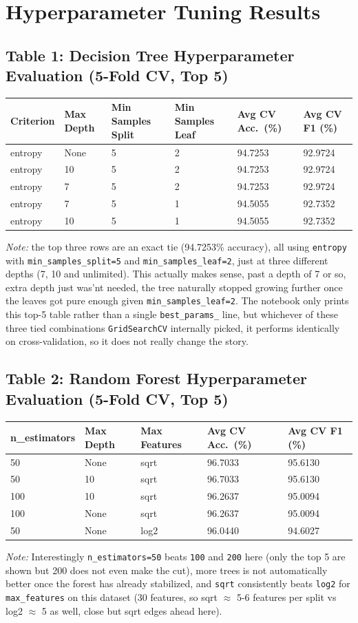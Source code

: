 \documentclass[12pt,a4paper]{article}
\begin{document}
\section{Hyperparameter Tuning Results}

\subsection*{Table 1: Decision Tree Hyperparameter Evaluation (5-Fold CV, Top 5)}
\begin{longtable}{p{1.6cm}p{1.6cm}p{2.4cm}p{2.4cm}p{2.2cm}p{2.2cm}}
\toprule
Criterion & Max Depth & Min Samples Split & Min Samples Leaf & Avg CV Acc.\ (\%) & Avg CV F1 (\%) \\
\midrule
entropy & None & 5 & 2 & 94.7253 & 92.9724 \\
entropy & 10 & 5 & 2 & 94.7253 & 92.9724 \\
entropy & 7 & 5 & 2 & 94.7253 & 92.9724 \\
entropy & 7 & 5 & 1 & 94.5055 & 92.7352 \\
entropy & 10 & 5 & 1 & 94.5055 & 92.7352 \\
\bottomrule
\end{longtable}
\textit{Note:} the top three rows are an exact tie (94.7253\% accuracy), all using \texttt{entropy} with \texttt{min\_samples\_split=5} and \texttt{min\_samples\_leaf=2}, just at three different depths (7, 10 and unlimited). This actually makes sense, past a depth of 7 or so, extra depth just was'nt needed, the tree naturally stopped growing further once the leaves got pure enough given \texttt{min\_samples\_leaf=2}. The notebook only prints this top-5 table rather than a single \texttt{best\_params\_} line, but whichever of these three tied combinations \texttt{GridSearchCV} internally picked, it performs identically on cross-validation, so it does not really change the story.

\subsection*{Table 2: Random Forest Hyperparameter Evaluation (5-Fold CV, Top 5)}
\begin{longtable}{p{2cm}p{1.6cm}p{2cm}p{2.5cm}p{2.5cm}}
\toprule
n\_estimators & Max Depth & Max Features & Avg CV Acc.\ (\%) & Avg CV F1 (\%) \\
\midrule
50 & None & sqrt & 96.7033 & 95.6130 \\
50 & 10 & sqrt & 96.7033 & 95.6130 \\
100 & 10 & sqrt & 96.2637 & 95.0094 \\
100 & None & sqrt & 96.2637 & 95.0094 \\
50 & None & log2 & 96.0440 & 94.6027 \\
\bottomrule
\end{longtable}
\textit{Note:} Interestingly \texttt{n\_estimators=50} beats \texttt{100} and \texttt{200} here (only the top 5 are shown but 200 does not even make the cut), more trees is not automatically better once the forest has already stabilized, and \texttt{sqrt} consistently beats \texttt{log2} for \texttt{max\_features} on this dataset (30 features, so sqrt $\approx$ 5-6 features per split vs log2 $\approx$ 5 as well, close but sqrt edges ahead here).
\end{document}
